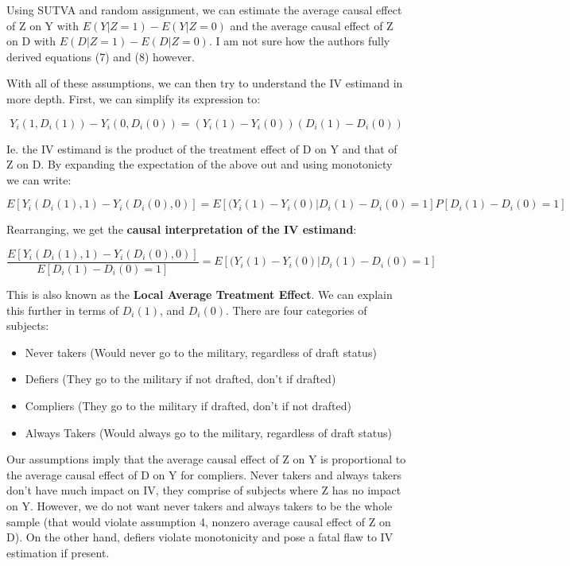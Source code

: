 \documentclass[12 pt, leqno]{article}
\begin{document}
Using SUTVA and random assignment, we can estimate the average causal effect of Z on Y with $E(Y|Z = 1) - E(Y|Z = 0)$ and the average causal effect of Z on D with $E(D|Z = 1) - E(D|Z = 0)$. I am not sure how the authors fully derived equations (7) and (8) however. 

With all of these assumptions, we can then try to understand the IV estimand in more depth. First, we can simplify its expression to:

$$Y_i(1, D_i(1)) - Y_i(0, D_i(0)) = (Y_i(1) - Y_i(0))(D_i(1) - D_i(0)) $$

Ie. the IV estimand is the product of the treatment effect of D on Y and that of Z on D. By expanding the expectation of the above out and using monotonicty we can write:

$$E[Y_i(D_i(1), 1) - Y_i(D_i(0), 0)] = E[(Y_i(1) - Y_i(0)| D_i(1) - D_i(0) = 1] P[D_i(1) - D_i(0) = 1] $$

Rearranging, we get the \textbf{causal interpretation of the IV estimand}:

$$\frac{E[Y_i(D_i(1), 1) - Y_i(D_i(0), 0)]}{E[D_i(1) - D_i(0) = 1]} = E[(Y_i(1) - Y_i(0)| D_i(1) - D_i(0) = 1]$$

This is also known as the \textbf{Local Average Treatment Effect}. We can explain this further in terms of $D_i(1)$, and $D_i(0)$. There are four categories of subjects:

\begin{itemize}
\item Never takers (Would never go to the military, regardless of draft status)
\item Defiers (They go to the military if not drafted, don't if drafted)
\item Compliers (They go to the military if drafted, don't if not drafted)
\item Always Takers (Would always go to the military, regardless of draft status)
\end{itemize}

Our assumptions imply that the average causal effect of Z on Y is proportional to the average causal effect of D on Y for compliers. Never takers and always takers don't have much impact on IV, they comprise of subjects where Z has no impact on Y. However, we do not want never takers and always takers to be the whole sample (that would violate assumption 4, nonzero average causal effect of Z on D). On the other hand, defiers violate monotonicity and pose a fatal flaw to IV estimation if present. 
\end{document}
